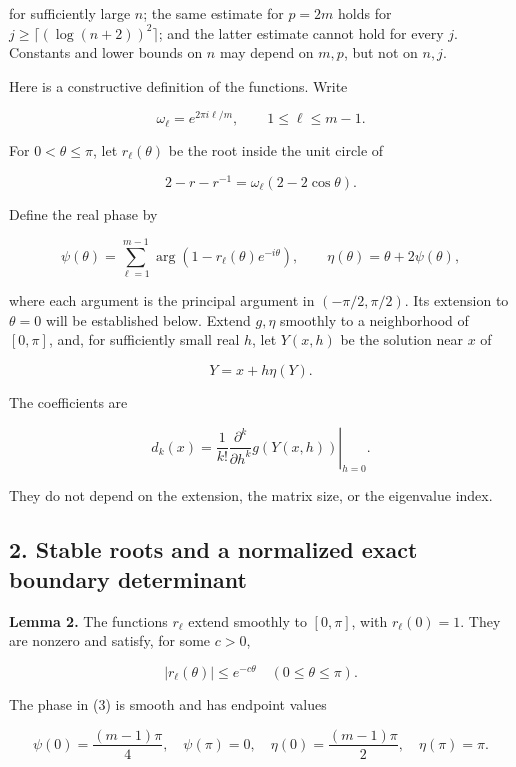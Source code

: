 \documentclass[10pt,a4paper]{article}
\begin{document}
for sufficiently large \(n\); the same estimate for \(p=2m\) holds for \(j\ge\lceil(\log(n+2))^2\rceil\); and the latter estimate cannot hold for every \(j\). Constants and lower bounds on \(n\) may depend on \(m,p\), but not on \(n,j\).

Here is a constructive definition of the functions. Write

\nopagebreak[3]
\[
\omega_\ell=e^{2\pi i\ell/m},\qquad 1\le\ell\le m-1.
\]

For \(0<\theta\le\pi\), let \(r_\ell(\theta)\) be the root inside the unit circle of

\nopagebreak[3]
\[
2-r-r^{-1}=\omega_\ell(2-2\cos\theta).
\tag{2}
\]

Define the real phase by

\nopagebreak[3]
\[
\psi(\theta)=\sum_{\ell=1}^{m-1}\arg(1-r_\ell(\theta)e^{-i\theta}),\qquad
\eta(\theta)=\theta+2\psi(\theta),
\tag{3}
\]

where each argument is the principal argument in \((-\pi/2,\pi/2)\). Its extension to \(\theta=0\) will be established below. Extend \(g,\eta\) smoothly to a neighborhood of \([0,\pi]\), and, for sufficiently small real \(h\), let \(Y(x,h)\) be the solution near \(x\) of

\nopagebreak[3]
\[
Y=x+h\eta(Y).
\tag{4}
\]

The coefficients are

\nopagebreak[3]
\[
d_k(x)=\frac{1}{k!}\left.\frac{\partial^k}{\partial h^k}g(Y(x,h))\right|_{h=0}.
\tag{5}
\]

They do not depend on the extension, the matrix size, or the eigenvalue index.

\subsection{2. Stable roots and a normalized exact boundary determinant}\label{stable-roots-and-a-normalized-exact-boundary-determinant}

\textbf{Lemma 2.} The functions \(r_\ell\) extend smoothly to \([0,\pi]\), with \(r_\ell(0)=1\). They are nonzero and satisfy, for some \(c>0\),

\nopagebreak[3]
\[
|r_\ell(\theta)|\le e^{-c\theta}\quad(0\le\theta\le\pi).
\tag{6}
\]

The phase in (3) is smooth and has endpoint values

\nopagebreak[3]
\[
\psi(0)=\frac{(m-1)\pi}{4},\quad \psi(\pi)=0,\quad
\eta(0)=\frac{(m-1)\pi}{2},\quad \eta(\pi)=\pi.
\tag{7}
\]
\end{document}
